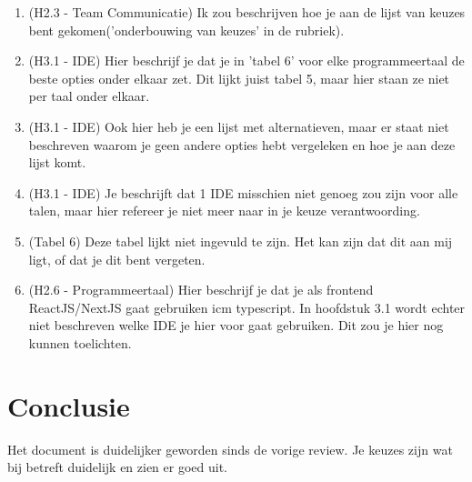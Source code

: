 \documentclass[a4paper]{article}
\begin{document}
\begin{enumerate}
  \item (H2.3 - Team Communicatie) Ik zou beschrijven hoe je aan de lijst van keuzes bent gekomen('onderbouwing van keuzes' in de rubriek).
  \item (H3.1 - IDE) Hier beschrijf je dat je in 'tabel 6' voor elke programmeertaal de beste opties onder elkaar zet. Dit lijkt juist tabel 5, maar hier staan ze niet per taal onder elkaar. 
  \item (H3.1 - IDE) Ook hier heb je een lijst met alternatieven, maar er staat niet beschreven waarom je geen andere opties hebt vergeleken en hoe je aan deze lijst komt. 
  \item (H3.1 - IDE) Je beschrijft dat 1 IDE misschien niet genoeg zou zijn voor alle talen, maar hier refereer je niet meer naar in je keuze verantwoording.
  \item (Tabel 6) Deze tabel lijkt niet ingevuld te zijn. Het kan zijn dat dit aan mij ligt, of dat je dit bent vergeten.
  \item (H2.6 - Programmeertaal) Hier beschrijf je dat je als frontend ReactJS/NextJS gaat gebruiken icm typescript. In hoofdstuk 3.1 wordt echter niet beschreven welke IDE je hier voor gaat gebruiken. Dit zou je hier nog kunnen toelichten.
\end{enumerate}


\section{Conclusie}
Het document is duidelijker geworden sinds de vorige review. Je keuzes zijn wat bij betreft duidelijk en zien er goed uit.
\end{document}
